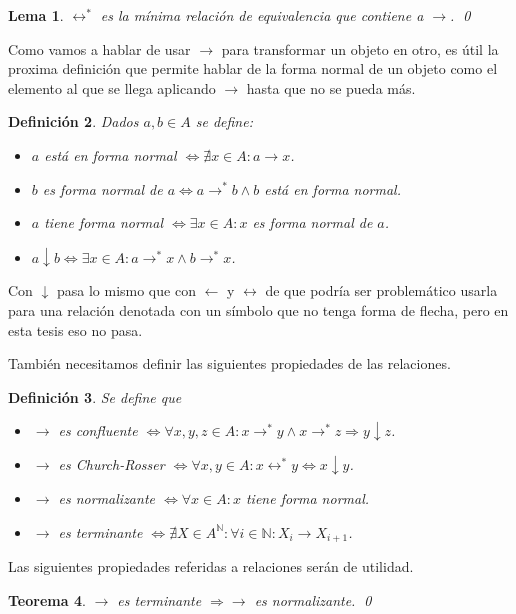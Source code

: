 \documentclass[12pt]{report}
\theoremstyle{customstyle}
\newtheorem{theorem}{Teorema}[chapter]
\newtheorem{definition}[theorem]{Definición}
\newtheorem{lemma}[theorem]{Lema}
\theoremstyle{factstyle}
\begin{document}
\begin{lemma}\label{lemma:↔* min equiv que contiene a →}
  $↔^*$ es la mínima relación de equivalencia que contiene a $→$.
  \qed
\end{lemma}

Como vamos a hablar de usar $→$ para transformar un objeto en otro, es útil la proxima definición que permite hablar de la forma normal de un objeto como el elemento al que se llega aplicando $→$ hasta que no se pueda más.

\begin{definition}\label{def:forma normal}
  Dados $a, b ∈ A$ se define:
  \begin{itemize}
    \item $a$ está en forma normal $⇔ ∄x ∈ A : a → x$.
    \item $b$ es forma normal de $a ⇔ a →^* b ∧ b$ está en forma normal.
    \item $a$ tiene forma normal $⇔ ∃x ∈ A : x$ es forma normal de $a$.
    \item $a ↓ b ⇔ ∃x ∈ A : a →^* x ∧ b →^* x$.
  \end{itemize}
\end{definition}

Con $↓$ pasa lo mismo que con $←$ y $↔$ de que podría ser problemático usarla para una relación denotada con un símbolo que no tenga forma de flecha, pero en esta tesis eso no pasa.

También necesitamos definir las siguientes propiedades de las relaciones.

\begin{definition} Se define que
  \begin{itemize}
    \item $→$ es confluente $⇔ ∀x, y, z ∈ A : x →^* y ∧ x →^* z ⇒ y ↓ z$.
    \item $→$ es Church-Rosser $⇔ ∀x, y ∈ A : x ↔^* y ⇔ x ↓ y$.
    \item $→$ es normalizante $⇔ ∀x ∈ A : x$ tiene forma normal.
    \item $→$ es terminante $⇔ ∄X ∈ A^ℕ : ∀i ∈ ℕ : X_i → X_{i + 1}$.
  \end{itemize}
\end{definition}

Las siguientes propiedades referidas a relaciones serán de utilidad.

\begin{theorem}\label{thm:terminante ⇒ normalizante}
  $→$ es terminante $⇒ →$ es normalizante.
  \qed
\end{theorem}
\end{document}
